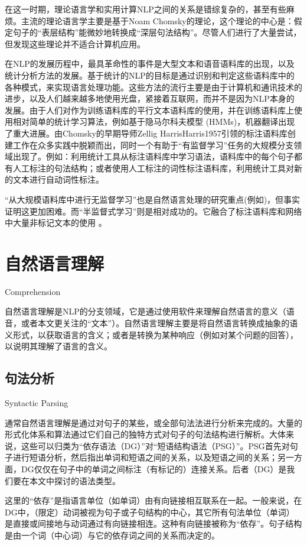 在这一时期，理论语言学和实用计算NLP之间的关系是错综复杂的，甚至有些麻烦。主流的理论语言学主要是基于Noam Chomsky的理论，这个理论的中心是：假定句子的“表层结构”能微妙地转换成“深层句法结构”。尽管人们进行了大量尝试，但发现这些理论并不适合计算机应用\cite{McCorduck2004}。

在NLP的发展历程中，最具革命性的事件是大型文本和语音语料库的出现，以及统计分析方法的发展。基于统计的NLP的目标是通过识别和判定这些语料库中的各种模式，来实现语言处理功能。这些方法的流行主要是由于计算机和通讯技术的进步，以及人们越来越多地使用光盘，紧接着互联网，而并不是因为NLP本身的发展。由于人们对作为训练语料库的平行文本语料库的使用，并在训练语料库上使用相对简单的统计学习算法，例如基于隐马尔科夫模型 (HMMs)\cite{Hutchins2005}，机器翻译出现了重大进展。由Chomsky的早期导师Zellig Harris{Harris1957}引领的标注语料库创建工作在众多实践中脱颖而出，同时一个有助于“有监督学习”任务的大规模分支领域出现了。例如：利用统计工具从标注语料库中学习语法，语料库中的每个句子都有人工标注的句法结构；或者使用人工标注的词性标注语料库，利用统计工具对新的文本进行自动词性标注。

“从大规模语料库中进行无监督学习”也是自然语言处理的研究重点(例如\cite{Spitkovsky2013})，但事实证明这更加困难。而“半监督式学习”则是相对成功的。它融合了标注语料库和网络中大量非标记文本的使用\cite{Abney2007} \cite{Guo2014}。


\section{自然语言理解}{Comprehension}

自然语言理解是NLP的分支领域，它是通过使用软件来理解自然语言的意义（语音，或者本文更关注的“文本”）。自然语言理解主要是将自然语言转换成抽象的语义形式，以获取语言的含义；或者是转换为某种响应（例如对某个问题的回答），以说明其理解了语言的含义。

\subsection{句法分析}{Syntactic Parsing}

通常自然语言理解是通过对句子的某些，或全部句法法进行分析来完成的。大量的形式化体系和算法通过它们自己的独特方式对句子的句法结构进行解析。大体来说，这些可以归类为“依存语法（DG）”对“短语结构语法（PSG）”。PSG首先对句子进行短语分析，然后指出单词和短语之间的关系，以及短语之间的关系；另一方面，DG仅仅在句子中的单词之间标注（有标记的）连接关系。后者（DG）是我们要在本文中探讨的语法类型。


这里的“依存”是指语言单位（如单词）由有向链接相互联系在一起。一般来说，在DG中，（限定）动词被视为句子或子句结构的中心，其它所有句法单位（单词）是直接或间接地与动词通过有向链接相连。这种有向链接被称为“依存”。句子结构是由一个词（中心词）与它的依存词之间的关系而决定的。


